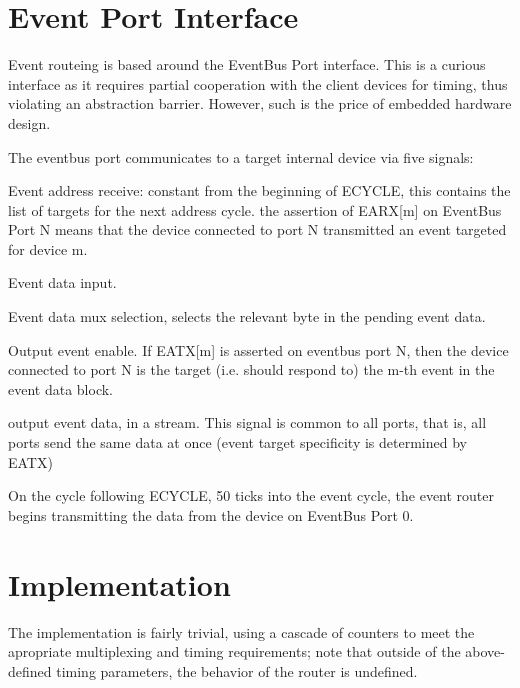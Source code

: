 
\section{Event Port Interface}


Event routeing is based around the EventBus Port interface. This is a
curious interface as it requires partial cooperation with the client
devices for timing, thus violating an abstraction barrier. However,
such is the price of embedded hardware design.


The eventbus port communicates to a target internal device via five signals:

 Event address receive: constant from the
beginning of ECYCLE, this contains the list of targets for the next
address cycle. the assertion of EARX[m] on EventBus Port N means that
the device connected to port N transmitted an event targeted for
device m.

 Event data input. 

 Event data mux selection, selects the relevant
byte in the pending event data.

 Output event enable. If EATX[m] is asserted on
eventbus port N, then the device connected to port N is the target
(i.e. should respond to) the m-th event in the event data block.

 output event data, in a stream. This signal is common to all ports, that is, all ports send the same data at once (event target specificity is determined by EATX)

On the cycle following ECYCLE, 50 ticks into the event cycle, the
event router begins transmitting the data from the device on EventBus
Port 0.

\section{Implementation}

The implementation is fairly trivial, using a cascade of counters to
meet the apropriate multiplexing and timing requirements; note that
outside of the above-defined timing parameters, the behavior of the
router is undefined.

